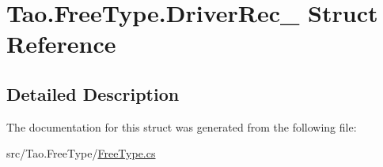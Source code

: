 \hypertarget{struct_tao_1_1_free_type_1_1_driver_rec__}{
\section{Tao.FreeType.DriverRec\_\- Struct Reference}
\label{struct_tao_1_1_free_type_1_1_driver_rec__}
}


\subsection{Detailed Description}


The documentation for this struct was generated from the following file:\begin{DoxyCompactItemize}
\item 
src/Tao.FreeType/\hyperlink{_free_type_8cs}{FreeType.cs}\end{DoxyCompactItemize}
